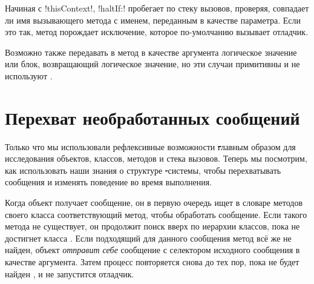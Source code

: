 \documentclass[a4paper,10pt,twoside]{book}
\begin{document}
Начиная с \ct!thisContext!, \ct!haltIf:! пробегает по стеку вызовов, проверяя, совпадает ли имя вызывающего метода с именем, переданным в качестве параметра. 
Если это так, метод порождает исключение, которое по-умолчанию вызывает отладчик.

Возможно также передавать в метод  в качестве аргумента логическое значение или блок, возвращающий логическое значение, но эти случаи примитивны и не используют .

\section{Перехват необработанных сообщений}

Только что мы использовали рефлексивные возможности \st главным образом для исследования объектов, классов, методов и стека вызовов. Теперь мы посмотрим, как использовать наши знания о структуре \st-системы, чтобы перехватывать сообщения и изменять поведение во время выполнения.

Когда объект получает сообщение, он в первую очередь ищет в словаре методов своего класса соответствующий метод, чтобы обработать сообщение.
Если такого метода не существует, он продолжит поиск вверх по иерархии классов, пока не достигнет класса . Если подходящий для данного сообщения метод всё же не найден, объект \emph{отправит себе} сообщение  с селектором исходного сообщения в качестве аргумента.
Затем процесс повторяется снова до тех пор, пока не будет найден , и не запустится отладчик.
\end{document}
